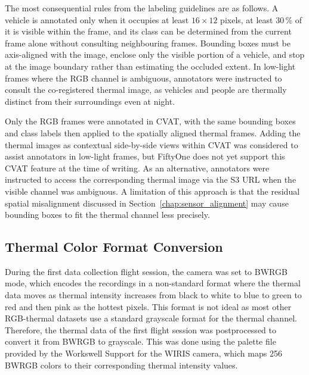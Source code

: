 \documentclass[12pt,oneside,bibtotoc,liststotoc]{scrbook}
\begin{document}
The most consequential rules from the labeling guidelines are as follows.
A vehicle is annotated only when it occupies at least $16 \times 12$ pixels, at least 30\,\% of it is
visible within the frame, and its class can be determined from the current frame alone without
consulting neighbouring frames.
Bounding boxes must be axis-aligned with the image, enclose only the visible portion of a vehicle, and
stop at the image boundary rather than estimating the occluded extent.
In low-light frames where the RGB channel is ambiguous, annotators were instructed to consult the
co-registered thermal image, as vehicles and people are thermally distinct from their surroundings
even at night.

Only the RGB frames were annotated in CVAT, with the same bounding boxes and class labels then applied
to the spatially aligned thermal frames.
Adding the thermal images as contextual side-by-side views within CVAT was considered to assist
annotators in low-light frames, but FiftyOne does not yet support this CVAT feature at the time of
writing. %
As an alternative, annotators were instructed to access the corresponding thermal image via the S3 URL
when the visible channel was ambiguous.
A limitation of this approach is that the residual spatial misalignment discussed in
Section~\ref{chap:sensor_alignment} may cause bounding boxes to fit the thermal channel less precisely.

\vspace{-1em}
\subsection{Thermal Color Format Conversion}

During the first data collection flight session, the camera was set to BWRGB mode, which encodes
the recordings in a non-standard format where the thermal data moves as thermal intensity increases
from black to white to blue to green to red and then pink as the hottest pixels. This format is not ideal
as most other RGB-thermal datasets use a standard grayscale format for the thermal channel. Therefore,
the thermal data of the first flight session was postprocessed to convert it from BWRGB to grayscale.
This was done using the palette file provided by the Workswell Support for the WIRIS camera, which maps 256 BWRGB
colors to their corresponding thermal intensity values.
\end{document}

